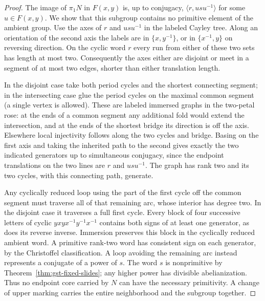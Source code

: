 \documentclass[11pt,letterpaper]{article}
\numberwithin{equation}{section}
\theoremstyle{remark}
\begin{document}
\begin{proof}
The image of \(\pi_1N\) in \(F(x,y)\) is, up to conjugacy,
\(\langle r,u s u^{-1}\rangle\) for some \(u\in F(x,y)\).
We show that this subgroup contains no primitive element of the
ambient group. Use the axes of \(r\) and \(usu^{-1}\) in the labeled
Cayley tree. Along an orientation of the second axis the labels are
in \(\{x,y^{-1}\}\), or in \(\{x^{-1},y\}\) on reversing direction.
On the cyclic word \(r\) every run from either of these two sets has
length at most two. Consequently the axes either are disjoint or meet
in a segment of at most two edges, shorter than either translation
length.

In the disjoint case take both period cycles and the shortest
connecting segment; in the intersecting case glue the period cycles
on the maximal common segment (a single vertex is allowed).
These are labeled immersed graphs in the two-petal rose: at the ends
of a common segment any additional fold would extend the intersection,
and at the ends of the shortest bridge its direction is off the axis.
Elsewhere local injectivity follows along the two cycles and bridge.
Basing on the first axis and taking the inherited path to the second
gives exactly the two indicated generators up to simultaneous
conjugacy, since the endpoint translations on the two lines are
\(r\) and \(usu^{-1}\). The graph has rank two and its two cycles,
with this connecting path, generate.

Any cyclically reduced loop using the part of the first cycle off the
common segment must traverse all of that remaining arc, whose interior
has degree two. In the disjoint case it traverses a full first cycle.
Every block of four successive letters of cyclic \(yxyx^{-1}y^{-1}x^{-1}\)
contains both signs of at least one generator, as does its reverse
inverse. Immersion preserves this block in the cyclically reduced
ambient word. A primitive rank-two word has consistent sign on
each generator, by the Christoffel classification. A loop avoiding
the remaining arc instead represents a conjugate of a power of \(s\).
The word \(s\) is nonprimitive by Theorem~\ref{thm:gst-fixed-slides};
any higher power has divisible abelianization. Thus no endpoint core
carried by \(N\) can have the necessary primitivity. A change of
upper marking carries the entire neighborhood and the subgroup
together.
\end{proof}
\end{document}
